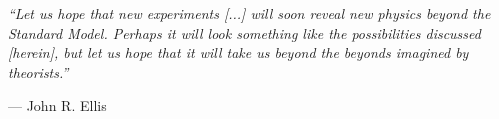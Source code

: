 
\begin{dedication} 


\raggedright\textit{``Let us hope that new experiments \textnormal{[...]} will soon reveal new physics beyond the Standard Model. Perhaps it will look something like the possibilities discussed \textnormal{[herein]}, but let us hope that it will take us beyond the beyonds imagined by theorists.''
}
\par\raggedleft--- \textup{John R. Ellis}


\end{dedication}

